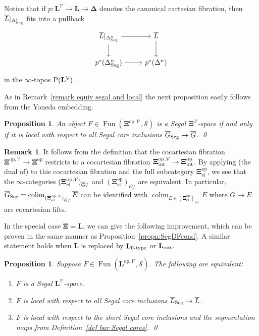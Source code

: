 \documentclass{amsart}
\numberwithin{theorem}{subsection}
\newtheorem{proposition}[theorem]{Proposition}
\newtheorem{propn}[theorem]{Proposition}
\theoremstyle{definition}
\newtheorem{remark}[theorem]{Remark}
\providecommand{\op}{\mathrm{op}}
\providecommand{\xel}{\mathrm{el}}
\newcommand{\xFun}{\operatorname{Fun}}
\DeclareMathOperator*{\colim}{colim}
\newcommand{\xS}{\mathcal{S}}
\newcommand{\xV}{\mathcal{V}}
\newcommand{\Pre}{\name{P}}
\newcommand{\name}[1]{\ensuremath{\text{\textup{#1}}}}
\newcommand{\simp}{\mathbf{\Delta}}
\newcommand{\levelg}{\mathbf{L}}
\newcommand{\levelV}{\levelg^\xV}
\newcommand{\gc}{\mathbf{\Xi}}
\newcommand{\gcint}{\gc_{\name{int}}}
\newcommand{\gcel}{\gc_{\xel}}
\newcommand{\gcV}{\gc^{\xV}}
\newcommand{\opgcV}{\gc^{\op,\xV}}
\newcommand{\opgcVint}{\gc^{\op,\xV}_{\name{int}}}
\newcommand{\opgcVel}{\gc^{\op,\xV}_{\name{el}}}
\newcommand{\Seg}{\name{Seg}}
\begin{document}
Notice that if $p \colon \levelV \to \levelg \to \simp$ denotes the canonical cartesian fibration, then $\overline L|_{\Delta^n_{\Seg}}$ fits into a pullback
\[ \begin{tikzcd}
\overline L|_{\Delta^n_{\Seg}} \rar \dar & \overline L \dar \\
p^*(\Delta^n_{\Seg}) \rar & p^*(\Delta^n)
\end{tikzcd} \]
in the $\infty$-topos $\Pre(\levelV)$.


As in Remark~\ref{remark equiv segal and local} the next proposition easily follows from the Yoneda embedding.
\begin{proposition}\label{proposition segal local gcv}
	An object $F \in \xFun(\opgcV,\xS)$ is a Segal $\gcV$-space if and only if it is local with respect to all Segal core inclusions $\overline G_\Seg \to \overline G$. \qed
\end{proposition}

\begin{remark}
	It follows from the definition that the cocartesian fibration ${\opgcV}\to \gc^{\op}$ restricts to a cocartesian fibration $\opgcVint \to \gcint^\op$. 
	By applying (the dual of) \cite[Lemma 2.3.13]{ChuHaugseng} to this cocartesian fibration and the full subcategory $\gcel^\op$, we see that the $\infty$-categories $(\opgcVel)_{\overline G/}$ and $(\gcel^\op)_{G/}$ are equivalent. 
	In particular, $\overline G_{\Seg}= \colim_{(\opgcVel)_{\overline G/}} \overline E$ can be identified with $\colim_{E\in (\gcel^\op)_{G/}} \overline E$ where $\overline G \to \overline E$ are cocartesian lifts.
\end{remark}


In the special case $\gc=\levelg$, we can give the following improvement, which can be proven in the same manner as Proposition~\ref{propn:SegDFcond}.
A similar statement holds when $\levelg$ is replaced by $\levelg_{\name{0-type}}$ or $\levelg_{\name{out}}$.

\begin{propn}\label{propn:SegDFVcond}
Suppose $F \in \xFun(\levelg^{\op,\xV},\xS)$.
The following are equivalent:
\begin{enumerate}
\item $F$ is a Segal $\levelV$-space. \label{SegDFVcond segal}
\item $F$ is local with respect to all Segal core inclusions $\overline L_{\Seg} \to \overline L$. \label{segDFVcond segal core}
\item $F$ is local with respect to the short Segal core inclusions and the segmentation maps from Definition~\ref{def bar Segal cores}. \label{segDFVcond short segmentation} 
\qed
\end{enumerate}
\end{propn}
\end{document}

